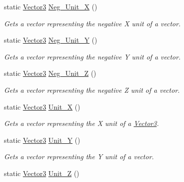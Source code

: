 \begin{DoxyCompactItemize}
\item 
static \hyperlink{classMezzanine_1_1Vector3}{Vector3} \hyperlink{classMezzanine_1_1Vector3_a623e9d9270a10470adae238ff99c2047}{Neg\_\-Unit\_\-X} ()
\begin{DoxyCompactList}\small\item\em Gets a vector representing the negative X unit of a vector. \item\end{DoxyCompactList}\item 
static \hyperlink{classMezzanine_1_1Vector3}{Vector3} \hyperlink{classMezzanine_1_1Vector3_aa1d03a53c2243aea84cf36348185aa31}{Neg\_\-Unit\_\-Y} ()
\begin{DoxyCompactList}\small\item\em Gets a vector representing the negative Y unit of a vector. \item\end{DoxyCompactList}\item 
static \hyperlink{classMezzanine_1_1Vector3}{Vector3} \hyperlink{classMezzanine_1_1Vector3_a455fbf24b646a69bebaf3b7aea0bde5b}{Neg\_\-Unit\_\-Z} ()
\begin{DoxyCompactList}\small\item\em Gets a vector representing the negative Z unit of a vector. \item\end{DoxyCompactList}\item 
static \hyperlink{classMezzanine_1_1Vector3}{Vector3} \hyperlink{classMezzanine_1_1Vector3_aa3d186d62631a38fe6cd553a1a92469a}{Unit\_\-X} ()
\begin{DoxyCompactList}\small\item\em Gets a vector representing the X unit of a \hyperlink{classMezzanine_1_1Vector3}{Vector3}. \item\end{DoxyCompactList}\item 
static \hyperlink{classMezzanine_1_1Vector3}{Vector3} \hyperlink{classMezzanine_1_1Vector3_a62285c6842027aec46da54553c22bc61}{Unit\_\-Y} ()
\begin{DoxyCompactList}\small\item\em Gets a vector representing the Y unit of a vector. \item\end{DoxyCompactList}\item 
static \hyperlink{classMezzanine_1_1Vector3}{Vector3} \hyperlink{classMezzanine_1_1Vector3_a6a70011d21182d44fd458458b1627ea1}{Unit\_\-Z} ()

\end{DoxyCompactItemize}

